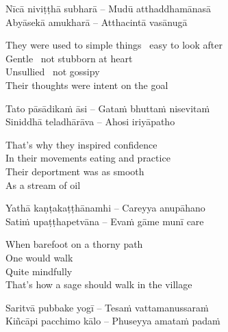\begin{twochants}
  Nīcā niviṭṭhā subharā – Mudū atthaddhamānasā\\
  Abyāsekā amukharā – Atthacintā vasānugā\\
\end{twochants}

\begin{english-verses}
  They were used to simple things \breathmark\ easy to look after\\
  Gentle \breathmark\ not stubborn at heart\\
  Unsullied \breathmark\ not gossipy\\
  Their thoughts were intent on the goal
\end{english-verses}

\begin{twochants}
  Tato pāsādikaṁ āsi – Gataṁ bhuttaṁ nisevitaṁ\\
  Siniddhā teladhārāva – Ahosi iriyāpatho\\
\end{twochants}

\begin{english-verses}
  That's why they inspired confidence\\
  In their movements eating and practice\\
  Their deportment was as smooth\\
  As a stream of oil
\end{english-verses}

\begin{twochants}
  Yathā kaṇṭakaṭṭhānamhi – Careyya anupāhano\\
  Satiṁ upaṭṭhapetvāna – Evaṁ gāme munī care\\
\end{twochants}

\begin{english-verses}
  When barefoot on a thorny path\\
  One would walk\\
  Quite mindfully\\
  That's how a sage should walk in the village
\end{english-verses}

\begin{twochants}
  Saritvā pubbake yogī – Tesaṁ vattamanussaraṁ\\
  Kiñcāpi pacchimo kālo – Phuseyya amataṁ padaṁ\\
\end{twochants}

